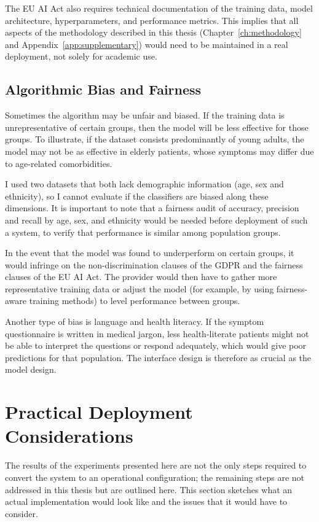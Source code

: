 The EU AI Act also requires technical documentation of the training data, model architecture, hyperparameters, and performance metrics. This implies that all aspects of the methodology described in this thesis (Chapter~\ref{ch:methodology} and Appendix~\ref{app:supplementary}) would need to be maintained in a real deployment, not solely for academic use.

\subsection{Algorithmic Bias and Fairness}

Sometimes the algorithm may be unfair and biased. If the training data is unrepresentative of certain groups, then the model will be less effective for those groups. To illustrate, if the dataset consists predominantly of young adults, the model may not be as effective in elderly patients, whose symptoms may differ due to age-related comorbidities.

I used two datasets that both lack demographic information (age, sex and ethnicity), so I cannot evaluate if the classifiers are biased along these dimensions. It is important to note that a fairness audit of accuracy, precision and recall by age, sex, and ethnicity would be needed before deployment of such a system, to verify that performance is similar among population groups.

In the event that the model was found to underperform on certain groups, it would infringe on the non-discrimination clauses of the GDPR and the fairness clauses of the EU AI Act. The provider would then have to gather more representative training data or adjust the model (for example, by using fairness-aware training methods) to level performance between groups.

Another type of bias is language and health literacy. If the symptom questionnaire is written in medical jargon, less health-literate patients might not be able to interpret the questions or respond adequately, which would give poor predictions for that population. The interface design is therefore as crucial as the model design.

\section{Practical Deployment Considerations}
\label{sec:deployment}

The results of the experiments presented here are not the only steps required to convert the system to an operational configuration; the remaining steps are not addressed in this thesis but are outlined here. This section sketches what an actual implementation would look like and the issues that it would have to consider.

